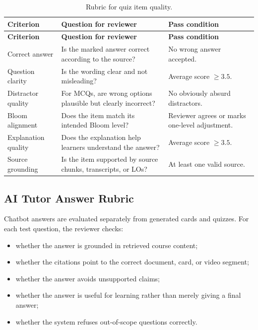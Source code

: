 \begin{longtable}{|p{3.8cm}|p{6.6cm}|p{3.1cm}|}
    \caption{Rubric for quiz item quality.}
    \label{tab:quiz-rubric} \\
    \hline
    \textbf{Criterion} & \textbf{Question for reviewer} & \textbf{Pass condition} \\
    \hline
    \endfirsthead
    \hline
    \textbf{Criterion} & \textbf{Question for reviewer} & \textbf{Pass condition} \\
    \hline
    \endhead

    Correct answer
        & Is the marked answer correct according to the source?
        & No wrong answer accepted. \\
    \hline

    Question clarity
        & Is the wording clear and not misleading?
        & Average score $\geq 3.5$. \\
    \hline

    Distractor quality
        & For MCQs, are wrong options plausible but clearly incorrect?
        & No obviously absurd distractors. \\
    \hline

    Bloom alignment
        & Does the item match its intended Bloom level?
        & Reviewer agrees or marks one-level adjustment. \\
    \hline

    Explanation quality
        & Does the explanation help learners understand the answer?
        & Average score $\geq 3.5$. \\
    \hline

    Source grounding
        & Is the item supported by source chunks, transcripts, or LOs?
        & At least one valid source. \\
    \hline
\end{longtable}

\subsection{AI Tutor Answer Rubric}

Chatbot answers are evaluated separately from generated cards and quizzes.
For each test question, the reviewer checks:

\begin{itemize}
    \item whether the answer is grounded in retrieved course content;
    \item whether the citations point to the correct document, card, or video
          segment;
    \item whether the answer avoids unsupported claims;
    \item whether the answer is useful for learning rather than merely giving a
          final answer;
    \item whether the system refuses out-of-scope questions correctly.
\end{itemize}

